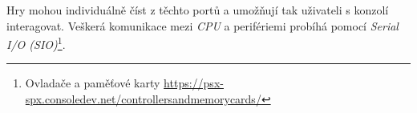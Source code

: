Hry mohou individuálně číst z těchto portů a umožňují tak uživateli s konzolí interagovat. 
Veškerá komunikace mezi \textit{CPU} a perifériemi probíhá pomocí \textit{Serial I/O (SIO)}\footnote{Ovladače a paměťové karty\cite{PSXSpec} \url{https://psx-spx.consoledev.net/controllersandmemorycards/}}.













